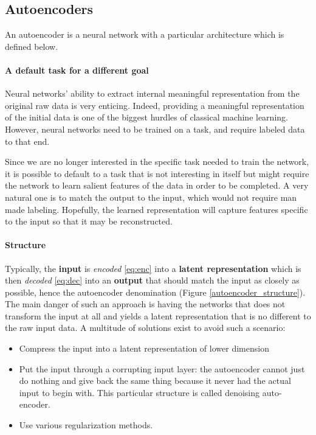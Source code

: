 \documentclass[conference]{IEEEtran}
\begin{document}
\subsection{Autoencoders}

An autoencoder \cite{Hinton504} is a neural network with a particular
architecture which is defined below.

\paragraph{A default task for a different goal}

Neural networks' ability to extract internal meaningful representation from the
original raw data is very enticing. Indeed, providing a meaningful
representation of the initial data is one of the biggest hurdles of classical
machine learning. However, neural networks need to be trained on a task, and
require labeled data to that end.

Since we are no longer interested in the specific task needed to train the
network, it is possible to default to a task that is not interesting in itself
but might require the network to learn salient features of the data in order to
be completed. A very natural one is to match the output to the input, which
would not require man made labeling. Hopefully, the learned representation will
capture features specific to the input so that it may be reconstructed.

\paragraph{Structure}

Typically, the \textbf{input} is \textit{encoded} \eqref{eq:enc} into a \textbf{latent
  representation} which is then \textit{decoded} \eqref{eq:dec} into an \textbf{output} that
should match the input as closely as possible, hence the autoencoder
denomination (Figure \ref{autoencoder_structure}). The main danger of such an approach is having the networks that
does not transform the input at all and yields a latent representation that is
no different to the raw input data. A multitude of solutions exist to avoid such
a scenario:
\begin{itemize}
\item Compress the input into a latent representation of lower dimension
\item Put the input through a corrupting input layer: the autoencoder cannot
  just do nothing and give back the same thing because it never had the actual
  input to begin with. This particular structure is called denoising auto-encoder.
\item Use various regularization methods.
\end{itemize}
\end{document}
